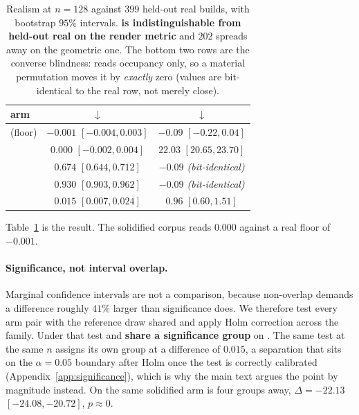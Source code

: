 \begin{table}[t]
\centering
\small
\caption{Realism at $n{=}128$ against $399$ held-out real builds, with
bootstrap $95\%$ intervals. \textbf{\solidify{} is indistinguishable from
held-out real on the render metric} and $202$ spreads away on the geometric one.
The bottom two rows are the converse blindness: \vkid{} reads occupancy only,
so a material permutation moves it by \emph{exactly} zero (values are
bit-identical to the real row, not merely close).}
\label{tab:blindness}
\begin{tabular}{lcc}
\toprule
arm & \mvkid{} $\downarrow$ & \vkid{} $\downarrow$ \\
\midrule
\realheld{} (floor)       & $-0.001$ $[-0.004, 0.003]$ & $-0.09$ $[-0.22, 0.04]$ \\
\textbf{\solidify{}}   & $\mathbf{0.000}$ $[-0.002, 0.004]$ & $\mathbf{22.03}$ $[20.65, 23.70]$ \\
\matshuffle{}& $0.674$ $[0.644, 0.712]$ & \emph{$-0.09$ (bit-identical)} \\
\monochrome{}          & $0.930$ $[0.903, 0.962]$ & \emph{$-0.09$ (bit-identical)} \\
\traincopy{}          & $0.015$ $[0.007, 0.024]$ & $0.96$ $[0.60, 1.51]$ \\
\bottomrule
\end{tabular}
\end{table}

Table~\ref{tab:blindness} is the result. The solidified corpus reads $0.000$
against a real floor of $-0.001$.

\paragraph{Significance, not interval overlap.}
Marginal confidence intervals are not a comparison, because non-overlap demands
a difference roughly $41\%$ larger than significance does. We therefore test every
arm pair with the reference draw shared and apply Holm correction
\citep{holm1979simple} across the family. Under that test
\solidify{} and \realheld{} \textbf{share a significance
group} on \mvkid{}. The same test at the same $n$ assigns
\traincopy{} its own group at a difference of $0.015$, a separation that sits on the $\alpha{=}0.05$ boundary after Holm once the test is correctly calibrated (Appendix~\ref{app:significance}), which is why the main text argues the point by magnitude instead. On \vkid{}
the same solidified arm is four groups away, $\Delta = -22.13$
$[-24.08, -20.72]$, $p \approx 0$.


